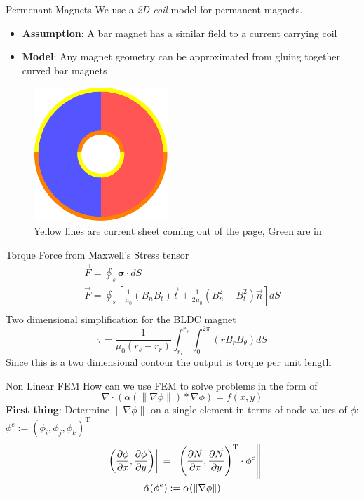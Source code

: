 \documentclass{beamer}
\newcommand\norm[1]{\left\lVert#1\right\rVert}
\begin{document}
    \begin{frame}{Permenant Magnets}
        We use a \textit{2D-coil} model for permanent magnets.
        \begin{itemize}
            \item \textbf{Assumption}: A bar magnet has a similar field to a current carrying coil
            \item \textbf{Model}: Any magnet geometry can be approximated from gluing together curved bar magnets
        \end{itemize}
        \begin{figure}
            \center
            \includegraphics[width=2in]{current_magnet.pdf}
            \caption*{Yellow lines are current sheet coming out of the page, Green are in}
        \end{figure}
    \end{frame}
    \begin{frame}{Torque}
        Force from Maxwell's Stress tensor
        \begin{gather*}
            \vec{F}=\oint_{s} \mathbf{\sigma} \cdot d S\\
            \vec{F}=\oint_{s}\left[\frac{1}{\mu_{0}}\left(B_{n} B_{t}\right) \vec{t}+\frac{1}{2 \mu_{0}}\left(B_{n}^{2}-B_{t}^{2}\right) \vec{n}\right] d S\\
        \end{gather*}
        Two dimensional simplification for the BLDC magnet
        \begin{equation*}
            \tau=\frac{1}{\mu_{0}\left(r_{s}-r_{r}\right)} \int_{r_{r}}^{r_{s}} \int_{0}^{2 \pi}\left(r B_{r} B_{\theta}\right) dS
        \end{equation*}
        Since this is a two dimensional contour the output is torque per unit length
    \end{frame}
    \begin{frame}{Non Linear FEM}
        How can we use FEM to solve problems in the form of
        \[\nabla\cdot\left(\alpha(\|\nabla\phi\|)*\nabla\phi\right)=f(x,y)\]
        \textbf{First thing}: Determine $\|\nabla\phi\|$ on a single element in terms of node values of $\phi$: $\phi^{e}:=\left( \phi_i, \phi_j, \phi_k \right)^{\text{T}}$
        \begin{gather*}
            \norm{\left(\pdv{\phi}{x},\pdv{\phi}{y}\right)}=\norm{\left(\pdv{\vec{N}}{x}, \pdv{\vec{N}}{y} \right)^{\text{T}}\cdot \phi^{e}}\\
            \hat{\alpha}(\phi^e):=\alpha(\norm{\nabla\phi})
        \end{gather*}
    \end{frame}
\end{document}
